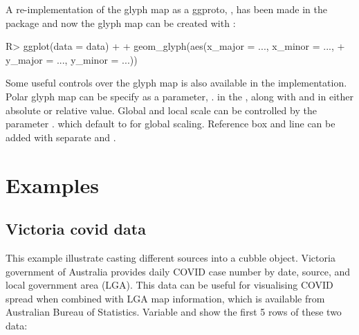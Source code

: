 \documentclass[
]{jss}
\begin{document}
A re-implementation of the glyph map as a ggproto, , has been made in the  package and now the glyph map can be created with :

\begin{CodeChunk}
\begin{CodeInput}
R> ggplot(data = data) +
+   geom_glyph(aes(x_major = ..., x_minor = ..., 
+                  y_major = ..., y_minor = ...))
\end{CodeInput}
\end{CodeChunk}

Some useful controls over the glyph map is also available in the  implementation. Polar glyph map can be specify as a parameter, . in the , along with  and  in either absolute or relative value. Global and local scale can be controlled by the parameter . which default to  for global scaling. Reference box and line can be added with separate  and .

\hypertarget{examples}{%
\section{Examples}\label{examples}}

\hypertarget{victoria-covid-data}{%
\subsection{Victoria covid data}\label{victoria-covid-data}}

This example illustrate casting different sources into a cubble object. Victoria government of Australia provides daily COVID case number by date, source, and local government area (LGA). This data can be useful for visualising COVID spread when combined with LGA map information, which is available from Australian Bureau of Statistics. Variable  and  show the first 5 rows of these two data:
\end{document}
